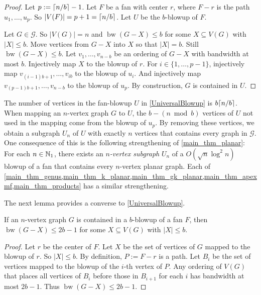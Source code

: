 \documentclass{patmorin}
\renewcommand{\leq}{\leqslant}
\DeclareMathOperator{\bw}{bw}
\newcommand{\GG}{\mathcal{G}}
\begin{document}
\begin{proof}
Let $p:={\lceil n/b \rceil}-1$. Let $F$ be a fan with center $r$, where $F-r$ is the path $u_1,\dots,u_p$. So $|V(F)|=p+1={\lceil n/b \rceil}$. Let $U$ be the $b$-blowup of $F$.

Let $G\in\GG$. So $|V(G)|=n$ and $\bw(G-X)\leq b$ for some $X\subseteq V(G)$ with $|X|\leq b$. Move vertices from $G-X$ into $X$ so that $|X|=b$. Still $\bw(G-X)\leq b$. Let $v_1,\dots,v_{n-b}$ be an ordering of $G-X$ with bandwidth at most $b$. Injectively map $X$ to the blowup of $r$. For $i\in\{1,\dots,p-1\}$, injectively map $v_{(i-1)b+1},\dots,v_{ib}$ to the blowup of $u_i$. And injectively map $v_{(p-1)b+1},\dots,v_{n-b}$ to the blowup of $u_p$. By construction, $G$ is contained in $U$. %
\end{proof}

\begin{rem}
    The number of vertices in the fan-blowup $U$ in \cref{UniversalBlowup} is $b{\lceil n/b \rceil}$.  When mapping an $n$-vertex graph $G$ to $U$, the $b-(n\bmod b)$ vertices of $U$ not used in the mapping come from the blowup of $u_p$.  By removing these vertices, we obtain a subgraph $U_n$ of $U$ with exactly $n$ vertices that contains every graph in $\mathcal{G}$.  One consequence of this is the following strengthening of \cref{main_thm_planar}: For each $n\in\mathbb{N}_1$, there exists an \emph{$n$-vertex subgraph} $U_n$ of a $O(\sqrt{n}\log^2 n)$ blowup of a fan that contains every $n$-vertex planar graph.  Each of  \cref{main_thm_genus,main_thm_k_planar,main_thm_gk_planar,main_thm_apexmf,main_thm_products} has a similar strengthening.
\end{rem}

The next lemma provides a converse to  \cref{UniversalBlowup}. 

\begin{lem}
\label{blowup-bandwidth}
If an $n$-vertex graph $G$ is contained in a $b$-blowup of a fan $F$, then $\bw(G-X)\leq 2b-1$ for some $X\subseteq V(G)$ with $|X|\leq b$.     
\end{lem}

\begin{proof}
Let $r$ be the center of $F$. Let $X$ be the set of vertices of $G$ mapped to the blowup of $r$. So $|X|\leq b$. By definition, $P:=F-r$ is a path. Let $B_i$ be the set of vertices mapped to the blowup of the $i$-th vertex of $P$. Any ordering of $V(G)$ that places all vertices of $B_i$ before those in $B_{i+1}$ for each $i$ has bandwidth at most $2b-1$. Thus $\bw(G-X)\leq 2b-1$. 
\end{proof}
\end{document}
